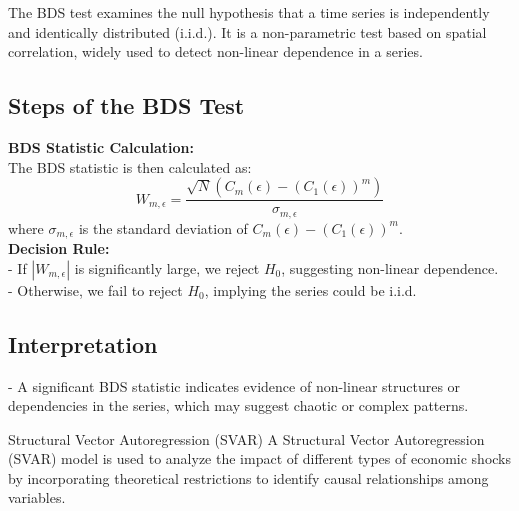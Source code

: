 \documentclass{beamer}
\begin{document}
{\begin{frame}
The BDS test examines the null hypothesis that a time series is independently and identically distributed (i.i.d.). It is a non-parametric test based on spatial correlation, widely used to detect non-linear dependence in a series.

\subsection*{Steps of the BDS Test}
\textbf{BDS Statistic Calculation:}\\
   The BDS statistic is then calculated as:
   \[
   W_{m,\epsilon} = \frac{\sqrt{N} \left( C_m(\epsilon) - \left( C_1(\epsilon) \right)^m \right)}{\sigma_{m,\epsilon}}
   \]
   where \( \sigma_{m,\epsilon} \) is the standard deviation of \( C_m(\epsilon) - \left( C_1(\epsilon) \right)^m \).\\
\textbf{Decision Rule:} \\
   - If \( |W_{m,\epsilon}| \) is significantly large, we reject \( H_0 \), suggesting non-linear dependence.\\
   - Otherwise, we fail to reject \( H_0 \), implying the series could be i.i.d.\\
\subsection*{Interpretation}
- A significant BDS statistic indicates evidence of non-linear structures or dependencies in the series, which may suggest chaotic or complex patterns.
\end{frame}
\begin{frame}{Structural Vector Autoregression (SVAR)}
A Structural Vector Autoregression (SVAR) model is used to analyze the impact of different types of economic shocks by incorporating theoretical restrictions to identify causal relationships among variables.

\end{frame}}
\end{document}
